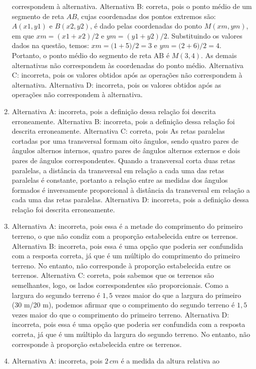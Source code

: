 \begin{enumerate}
correspondem à alternativa.
Alternativa B: correta, pois o ponto médio de um segmento de reta $AB$,
cujas coordenadas dos pontos extremos são: 
$A(x1, y1)$ e $B(x2, y2)$, é dado pelas coordenadas do ponto $M(xm, ym)$, em que 
$xm = (x1 + x2)/2$ e $ym = (y1 + y2)/2$. Substituindo os valores dados na questão, temos: $xm = (1 + $5$)/2 = 3$ e $ym = (2 + $6$)/2 = 4$. Portanto, o ponto médio do segmento de reta AB é $M(3, 4)$. As demais alternativas não correspondem às coordenadas do ponto médio.
Alternativa C: incorreta, pois os valores obtidos após as operações não
correspondem à alternativa.
Alternativa D: incorreta, pois os valores obtidos após as operações não
correspondem à alternativa.
\item Alternativa A: incorreta, pois a definição dessa relação foi descrita
erroneamente.
Alternativa B: incorreta, pois a definição dessa relação foi descrita
erroneamente.
Alternativa C: correta, pois As retas paralelas cortadas por uma
transversal formam oito ângulos, sendo quatro pares de ângulos alternos
internos, quatro pares de ângulos alternos externos e dois pares de
ângulos correspondentes. Quando a transversal corta duas retas
paralelas, a distância da transversal em relação a cada uma das retas
paralelas é constante, portanto a relação entre as medidas dos ângulos
formados é inversamente proporcional à distância da transversal em
relação a cada uma das retas paralelas.
Alternativa D: incorreta, pois a definição dessa relação foi descrita
erroneamente.
\item Alternativa A: incorreta, pois essa é a metade do comprimento do
primeiro terreno, o que não condiz com a proporção estabelecida entre os
terrenos.
Alternativa B: incorreta, pois essa é uma opção que poderia ser
confundida com a resposta correta, já que é um múltiplo do comprimento
do primeiro terreno. No entanto, não corresponde à proporção
estabelecida entre os terrenos.
Alternativa C: correta, pois sabemos que os terrenos são semelhantes,
logo, os lados correspondentes são proporcionais. Como a largura do
segundo terreno é $1,5$ vezes maior do que a largura do primeiro (30 m/20
m), podemos afirmar que o comprimento do segundo terreno é $1,5$ vezes
maior do que o comprimento do primeiro terreno.
Alternativa D: incorreta, pois essa é uma opção que poderia ser
confundida com a resposta correta, já que é um múltiplo da largura do
segundo terreno. No entanto, não corresponde à proporção estabelecida
entre os terrenos.
\item Alternativa A: incorreta, pois $2\,cm$ é a medida da altura relativa ao

\end{enumerate}
